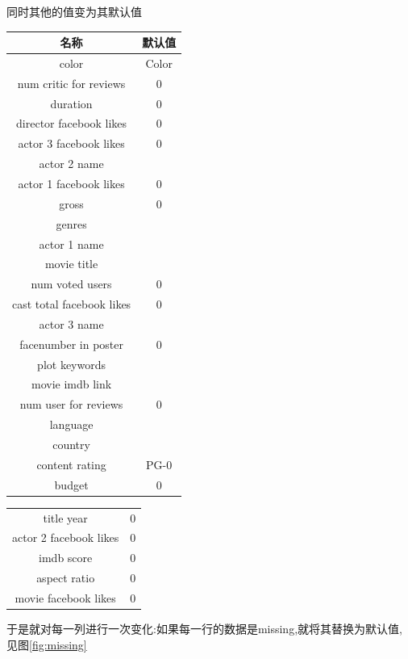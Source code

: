 \documentclass[a4paper]{article}
\begin{document}
同时其他的值变为其默认值

\begin{table}[h]
    \centering
    \begin{tabular}{ |c|c| }
名称 & 默认值 \\\hline
color & Color \\ 
num critic for reviews & 0 \\ 
duration & 0 \\ 
director facebook likes & 0 \\ 
actor 3 facebook likes & 0 \\ 
actor 2 name & \ \\ 
actor 1 facebook likes & 0 \\ 
gross & 0 \\ 
genres & \ \\ 
actor 1 name & \ \\ 
movie title &   \\ 
num voted users & 0 \\ 
cast total facebook likes & 0 \\ 
actor 3 name &  \\ 
facenumber in poster & 0 \\ 
plot keywords &  \\ 
movie imdb link &  \\ 
num user for reviews & 0 \\ 
language &  \\ 
country &  \\ 
content rating & PG-0 \\ 
budget & 0 \\ 
    \end{tabular}
\end{table}

\newpage

\begin{table}[h]
    \centering
    \begin{tabular}{ |c|c| }
title year & 0 \\ 
actor 2 facebook likes & 0 \\ 
imdb score & 0 \\ 
aspect ratio & 0 \\ 
movie facebook likes & 0 \\ 
\end{tabular}
\end{table}

于是就对每一列进行一次变化:如果每一行的数据是missing,就将其替换为默认值,见图\ref{fig:missing}
\end{document}
